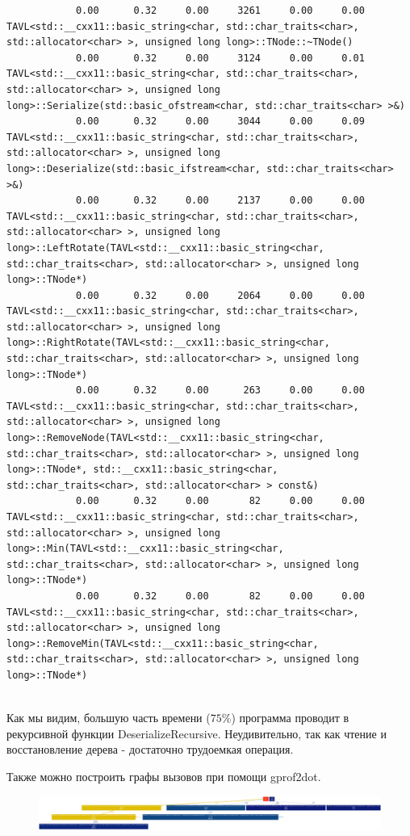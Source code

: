 \documentclass[12pt]{article}
\begin{document}
\begin{small}
\begin{verbatim}
			0.00      0.32     0.00     3261     0.00     0.00  TAVL<std::__cxx11::basic_string<char, std::char_traits<char>, std::allocator<char> >, unsigned long long>::TNode::~TNode()
			0.00      0.32     0.00     3124     0.00     0.01  TAVL<std::__cxx11::basic_string<char, std::char_traits<char>, std::allocator<char> >, unsigned long long>::Serialize(std::basic_ofstream<char, std::char_traits<char> >&)
			0.00      0.32     0.00     3044     0.00     0.09  TAVL<std::__cxx11::basic_string<char, std::char_traits<char>, std::allocator<char> >, unsigned long long>::Deserialize(std::basic_ifstream<char, std::char_traits<char> >&)
			0.00      0.32     0.00     2137     0.00     0.00  TAVL<std::__cxx11::basic_string<char, std::char_traits<char>, std::allocator<char> >, unsigned long long>::LeftRotate(TAVL<std::__cxx11::basic_string<char, std::char_traits<char>, std::allocator<char> >, unsigned long long>::TNode*)
			0.00      0.32     0.00     2064     0.00     0.00  TAVL<std::__cxx11::basic_string<char, std::char_traits<char>, std::allocator<char> >, unsigned long long>::RightRotate(TAVL<std::__cxx11::basic_string<char, std::char_traits<char>, std::allocator<char> >, unsigned long long>::TNode*)
			0.00      0.32     0.00      263     0.00     0.00  TAVL<std::__cxx11::basic_string<char, std::char_traits<char>, std::allocator<char> >, unsigned long long>::RemoveNode(TAVL<std::__cxx11::basic_string<char, std::char_traits<char>, std::allocator<char> >, unsigned long long>::TNode*, std::__cxx11::basic_string<char, std::char_traits<char>, std::allocator<char> > const&)
			0.00      0.32     0.00       82     0.00     0.00  TAVL<std::__cxx11::basic_string<char, std::char_traits<char>, std::allocator<char> >, unsigned long long>::Min(TAVL<std::__cxx11::basic_string<char, std::char_traits<char>, std::allocator<char> >, unsigned long long>::TNode*)
			0.00      0.32     0.00       82     0.00     0.00  TAVL<std::__cxx11::basic_string<char, std::char_traits<char>, std::allocator<char> >, unsigned long long>::RemoveMin(TAVL<std::__cxx11::basic_string<char, std::char_traits<char>, std::allocator<char> >, unsigned long long>::TNode*)
			
		\end{verbatim}
	\end{small}

	Как мы видим, большую часть времени ($75\% $) программа проводит в рекурсивной функции DeserializeRecursive. Неудивительно, так как чтение и восстановление дерева - достаточно трудоемкая операция.
	
	Также можно построить графы вызовов при помощи gprof2dot.
	\begin{figure}[h]
		\includegraphics[width=\linewidth]{output.png}
	\end{figure}
\end{document}
